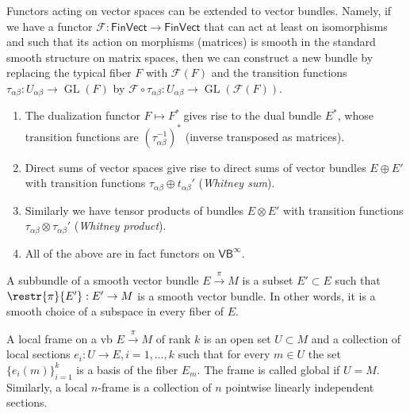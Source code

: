 \documentclass[english,letterpaper]{article}%
\numberwithin{equation}{section}
\numberwithin{figure}{section}
\numberwithin{table}{section}
\theoremstyle{definition}
\theoremstyle{definition}
\theoremstyle{definition}
\theoremstyle{plain}
\theoremstyle{plain}
\theoremstyle{plain}
\theoremstyle{plain}
\theoremstyle{remark}
\theoremstyle{remark}
\DeclareMathOperator{\GL}{GL}
\begin{document}
\begin{defn}\label{functors VB}
Functors acting on vector spaces can be extended to vector bundles. Namely, if we have a functor $\mathcal{F}:\mathsf{FinVect}\to\mathsf{FinVect}$ that can act at least on isomorphisms and such that its action on morphisms (matrices) is smooth in the standard smooth structure on matrix spaces, then we can construct a new bundle by replacing the typical fiber $F$ with $\mathcal{F}(F)$ and the transition functions $\tau_{\alpha\beta}:U_{\alpha\beta}\to \GL(F)$ by $\mathcal{F}\circ \tau_{\alpha\beta}:U_{\alpha\beta}\to \GL(\mathcal{F}(F))$.
    \begin{enumerate}
        \item The dualization functor $F\mapsto F^\ast$ gives rise to the dual bundle $E^\ast$, whose transition functions are $(\tau_{\alpha\beta}^{-1})^\ast$ (inverse transposed as matrices).
        \item Direct sums of vector spaces give rise to direct sums of vector bundles $E\oplus E'$ with transition functions $\tau_{\alpha\beta}\oplus t_{\alpha\beta}'$ (\emph{Whitney sum}).
        \item Similarly we have tensor products of bundles $E\otimes E'$ with transition functions $\tau_{\alpha\beta}\otimes \tau_{\alpha\beta}'$ (\emph{Whitney product}).
        \item All of the above are in fact functors on $\mathsf{VB}^\infty$.
    \end{enumerate}
\end{defn}


\begin{defn}[Subbundle]
A subbundle of a smooth vector bundle $E\overset{\pi}{\to}M$ is a subset $E'\subset E$ such that $\restr{\pi}{E'}:E'\to M$ is a smooth vector bundle. In other words, it is a smooth choice of a subspace in every fiber of $E$.
\end{defn}

\begin{defn}[Frames]
A local frame on a \gls{vb}  $E\overset{\pi}{\to}M$ of rank $k$ is an open set $U\subset M$ and a collection of local sections $e_i:U\to E,i=1,\ldots,k$ such that for every $m\in U$ the set $\{e_i(m)\}_{i=1}^k$ is a basis of the fiber $E_m$. The frame is called global if $U=M$. Similarly, a local $n$-frame is a collection of $n$ pointwise linearly independent sections.
\end{defn}
\end{document}
